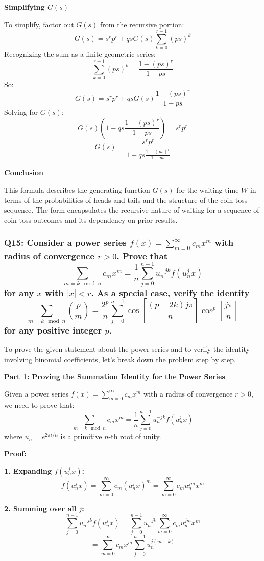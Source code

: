 \documentclass[8pt]{article}
\begin{document}
{\textbf{Simplifying \( G(s) \)}

To simplify, factor out \( G(s) \) from the recursive portion:
\[ G(s) = s^r p^r + q s G(s) \sum_{k=0}^{r-1} (ps)^k \]
Recognizing the sum as a finite geometric series:
\[ \sum_{k=0}^{r-1} (ps)^k = \frac{1-(ps)^r}{1-ps} \]
So:
\[ G(s) = s^r p^r + q s G(s) \frac{1-(ps)^r}{1-ps} \]
Solving for \( G(s) \):
\[ G(s) (1 - qs \frac{1-(ps)^r}{1-ps}) = s^r p^r \]
\[ G(s) = \frac{s^r p^r}{1 - qs \frac{1-(ps)^r}{1-ps}} \]

\textbf{Conclusion}

This formula describes the generating function \( G(s) \) for the waiting time \( W \) in terms of the probabilities of heads and tails and the structure of the coin-toss sequence. The form encapsulates the recursive nature of waiting for a sequence of coin toss outcomes and its dependency on prior results.

\subsubsection*{Q15:
Consider a power series \( f(x) = \sum_{m=0}^{\infty} c_m x^m \) with radius of convergence \( r > 0 \). Prove that
\[
\sum_{m = k \mod n} c_m x^m = \frac{1}{n} \sum_{j=0}^{n-1} u_n^{-jk} f(u_n^j x)
\]
for any \( x \) with \( |x| < r \). As a special case, verify the identity
\[
\sum_{m = k \mod n} \binom{p}{m} = \frac{2^p}{n} \sum_{j=0}^{n-1} \cos \left[ \frac{(p - 2k)j\pi}{n} \right] \cos^p \left[ \frac{j\pi}{n} \right]
\]
for any positive integer \( p \).}

To prove the given statement about the power series and to verify the identity involving binomial coefficients, let's break down the problem step by step.

\textbf{Part 1: Proving the Summation Identity for the Power Series}

Given a power series \( f(x) = \sum_{m=0}^{\infty} c_m x^m \) with a radius of convergence \( r > 0 \), we need to prove that:
\[
\sum_{m = k \mod n} c_m x^m = \frac{1}{n} \sum_{j=0}^{n-1} u_n^{-jk} f(u_n^j x)
\]
where \( u_n = e^{2\pi i/n} \) is a primitive \( n \)-th root of unity.

\textbf{Proof:}

\textbf{1. Expanding \( f(u_n^j x) \):}
   \[
   f(u_n^j x) = \sum_{m=0}^{\infty} c_m (u_n^j x)^m = \sum_{m=0}^{\infty} c_m u_n^{jm} x^m
   \]

\textbf{2. Summing over all \( j \):}
   \[
   \sum_{j=0}^{n-1} u_n^{-jk} f(u_n^j x) = \sum_{j=0}^{n-1} u_n^{-jk} \sum_{m=0}^{\infty} c_m u_n^{jm} x^m
   \]
   \[
   = \sum_{m=0}^{\infty} c_m x^m \sum_{j=0}^{n-1} u_n^{j(m-k)}
   \]

}
\end{document}
